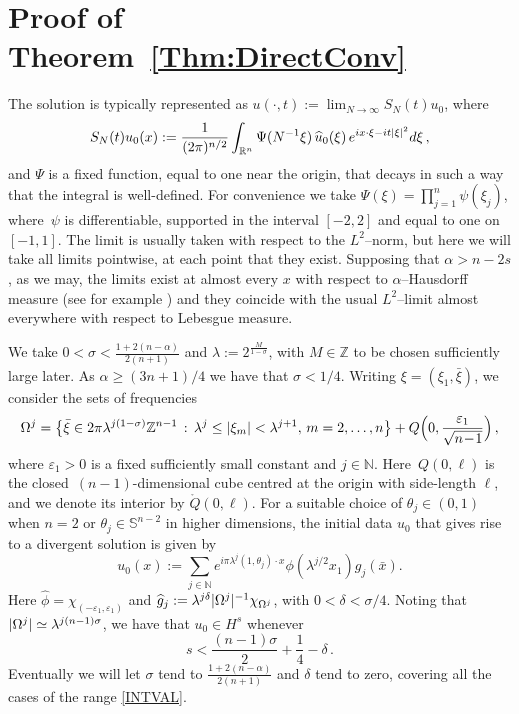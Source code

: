 \documentclass[biblatex]{pzorin-note}
\begin{document}
\section{Proof of Theorem~\ref{Thm:DirectConv}}


The solution is typically represented as $u(\cdot,t):= \lim_{N \to \infty} S_{N}(t)u_0$, where
\begin{equation}\label{rt}
S_{N}(t)u_0(x) :=
\frac{1}{(2\pi)^{n/2}} \int_{\mathbb{R}^n}
\Psi(N^{-1}\xi)\,
\widehat{u}_0(\xi)\, e^{ ix\cdot\xi - i t \lvert \xi \rvert^{2} } d \xi \, ,
\end{equation}
and $\Psi$ is a fixed function, equal to one near the origin, that decays in such a way that the integral is well-defined. For
convenience we take $\Psi(\xi)=\prod_{j=1}^{n} \psi(\xi_{j})$, where~$\psi$ is differentiable, supported in the interval $[-2,2]$ and equal to one on $[-1,1]$. The limit is usually taken with respect to the $L^2$--norm, but here we will take all limits pointwise, at each point that they exist. Supposing that $\alpha>n-2s$, as we may, the limits exist at almost every $x$ with respect to $\alpha$--Hausdorff measure (see for example \cite[Corollary 17.6]{M}) and they coincide with the usual $L^2$--limit almost everywhere with respect to Lebesgue measure.




We take $0< \sigma < \frac{1+2(n-\alpha) }{2(n+1)}$
and $\lambda := 2^{\frac{M}{1-\sigma}}$, with $M\in \mathbb{Z}$ to be chosen sufficiently large later.
As $\alpha \geq (3n+1)/4$ we have that $\sigma < 1/4$.
Writing $\xi=(\xi_1,\bar{\xi})$, we consider the sets of frequencies
\begin{equation}\nonumber
\Omega^{j} = \big\{ \bar{\xi} \in 2 \pi \lambda^{j(1-\sigma)} \mathbb{Z}^{n-1} \,:\, \lambda^{j} \leq \lvert \xi_{m} \rvert< \lambda^{j+1}, \, m=2,\ldots, n \big\} + Q\Big( 0,\frac{\varepsilon_{1}}{\sqrt{n\!-\!1}} \Big) \, ,
\end{equation}
where
$\varepsilon_{1} > 0$ is a fixed sufficiently small constant and $j\in \mathbb{N}$.
Here~$Q(0,\ell)$
is the closed~$(n-1)$-dimensional cube centred at the origin with side-length $\ell$, and we denote its interior by $\mathring{Q}(0,\ell)$.
For a suitable choice of $\theta_{j} \in (0,1)$ when $n=2$ or $\theta_{j}\in \mathbb{S}^{n-2}$ in higher dimensions, the initial data $u_0$ that gives rise to a divergent solution is given by
\begin{equation}\label{TestinfFunctBennFin}
u_0(x) := \sum_{j \in \mathbb{N}} e^{i\pi \lambda^j(1,\theta_{j})\cdot x}\phi(\lambda^{j/2}x_1)g_{j}(\bar{x}).
\end{equation}
Here $\widehat{\phi}=\chi_{(-\varepsilon_{1},\varepsilon_{1})}$ and
$\widehat{g}_{j} := \lambda^{j \delta } \lvert\Omega^j\rvert^{-1}\chi_{\Omega^{j}}$, with $0< \delta< \sigma/4$.
Noting that $\lvert \Omega^{j}\rvert \simeq \lambda^{j (n -1)\sigma}$, we have that $u_0\in H^{s}$ whenever
\begin{equation*}\label{URONS}
s < \frac{(n-1) \sigma }{2}+\frac{1}{4} - \delta \, .
\end{equation*}
Eventually we will let $\sigma$ tend to $ \frac{1+2(n-\alpha) }{2(n+1)}$ and $\delta$ tend to zero, covering all the cases of the range \eqref{INTVAL}.
\end{document}
